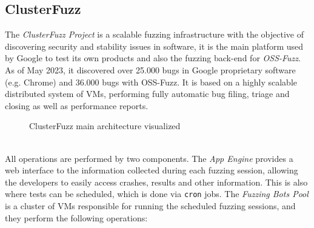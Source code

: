 \subsection{ClusterFuzz}
The \textit{ClusterFuzz Project} is a scalable fuzzing infrastructure with the objective of discovering security and stability issues in software, it is the main platform used by Google to test its own products and also the fuzzing back-end for \textit{OSS-Fuzz}.
\newline
As of May 2023, it discovered over 25.000 bugs in Google proprietary software (e.g. Chrome) and 36.000 bugs with OSS-Fuzz. \cite{clusterfuzz_docs}
\newline \newline
It is based on a highly scalable distributed system of VMs, performing fully automatic bug filing, triage and closing as well as performance reports.
\newline \newline
\begin{figure}[h]
\caption{ClusterFuzz main architecture visualized \cite{clusterfuzz_docs}}
\label{fig:clusterfuzz_architecture}
\end{figure}
\ \\
All operations are performed by two components.
\newline \newline
The \textit{App Engine} provides a web interface to the information collected during each fuzzing session, allowing the developers to easily access crashes, results and other information. This is also where tests can be scheduled, which is done via \verb|cron| jobs.
\newline \newline
The \textit{Fuzzing Bots Pool} is a cluster of VMs responsible for running the scheduled fuzzing sessions, and they perform the following operations:

